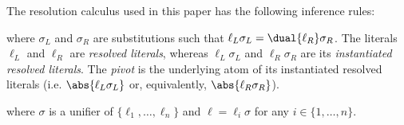 The resolution calculus used in this paper has the following inference rules: 


\begin{definition}[Resolution] \label{def:fores} \hfill
\begin{prooftree}
\end{prooftree}
where $\sigma_L$ and $\sigma_R$ are substitutions such that $\ell_L\sigma_L=\dual{\ell_R}\sigma_R$. The literals $\ell_L$ and $\ell_R$ are \emph{resolved literals}, whereas $\ell_L \sigma_L$ and $\ell_R \sigma_R$ are its \emph{instantiated resolved literals}. The \emph{pivot} is the underlying atom of its instantiated resolved literals (i.e. $\abs{\ell_L \sigma_L}$ or, equivalently, $\abs{\ell_R \sigma_R}$).
\end{definition}

\begin{definition}[Factoring] \label{def:fofact} \hfill
\begin{prooftree}
\end{prooftree}
where $\sigma$ is a unifier of $\{\ell_1,\ldots,\ell_n\}$ and $\ell=\ell_i\sigma$ for any $i\in \{1,\ldots,n\}$.
\end{definition}
